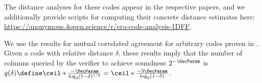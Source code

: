The distance analyses for these codes appear in the respective papers, and we additionally provide scripts for computing their concrete distance estimates here: \url{https://anonymous.4open.science/r/era-code-analysis-1DFF}.


We use the results for mutual correlated agreement for arbitrary codes proven in \cite{Zeilberger24,GaoKL24}.
Given a code with relative distance $\delta$, these results imply that the number of columns queried by the verifier to achieve soundness $2^{-\SecParam}$ is $q(\delta) \define \ceil*{\frac{-\SecParam}{\log_2 (1 - \delta)^{1/3}}} = \ceil*{\frac{-3\SecParam}{\log_2 (1 - \delta)}}$.


